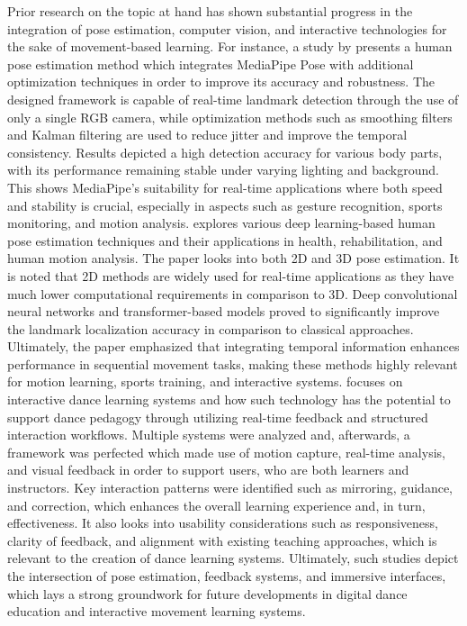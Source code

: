 Prior research on the topic at hand  has shown substantial progress in the integration of pose estimation, computer vision, and interactive technologies for the sake of movement-based learning. 
For instance, a study by \citet{app13042700} presents a human pose estimation method which integrates MediaPipe Pose with additional optimization techniques in order to improve its accuracy and robustness. The designed framework is capable of real-time landmark detection through the use of only a single RGB camera, while optimization methods such as smoothing filters and Kalman filtering are used to reduce jitter and improve the temporal consistency. Results depicted a high detection accuracy for various body parts, with its performance remaining stable under varying lighting and background. This shows MediaPipe’s suitability for real-time applications where both speed and stability is crucial, especially in aspects such as gesture recognition, sports monitoring, and motion analysis.
\citet{THARATIPYAKUL2024e36589} explores various deep learning-based human pose estimation techniques and their applications in health, rehabilitation, and human motion analysis. The paper looks into both 2D and 3D pose estimation. It is noted that 2D methods are widely used for real-time applications as they have much lower computational requirements in comparison to 3D. Deep convolutional neural networks and transformer-based models proved to significantly improve the landmark localization accuracy in comparison to classical approaches. Ultimately, the paper emphasized that integrating temporal information enhances performance in sequential movement tasks, making these methods highly relevant for motion learning, sports training, and interactive systems.
\citet{Raheb2019} focuses on interactive dance learning systems and how such technology has the potential to support dance pedagogy through utilizing real-time feedback and structured interaction workflows. Multiple systems were analyzed and, afterwards, a framework was perfected which made use of motion capture, real-time analysis, and visual feedback in order to support users, who are both learners and instructors. Key interaction patterns were identified such as mirroring, guidance, and correction, which enhances the overall learning experience and, in turn, effectiveness. It also looks into usability considerations such as responsiveness, clarity of feedback, and alignment with existing teaching approaches, which is relevant to the creation of dance learning systems.
Ultimately, such studies depict the intersection of  pose estimation, feedback systems, and immersive interfaces, which lays a strong groundwork for future developments in digital dance education and interactive movement learning systems.



